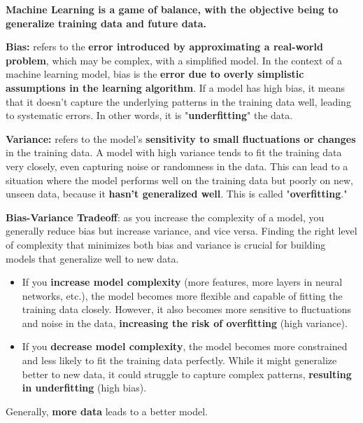 \textbf{Machine Learning is a game of balance, with the objective being to generalize training data and future data.}

\begin{definition}
\textbf{Bias:} refers to the \textbf{error introduced by approximating a real-world problem}, which may be complex, with a simplified model. In the context of a machine learning model, bias is the \textbf{error due to overly simplistic assumptions in the learning algorithm}. If a model has high bias, it means that it doesn't capture the underlying patterns in the training data well, leading to systematic errors. In other words, it is "\textbf{underfitting}" the data.
\end{definition}
    
\begin{definition}
\textbf{Variance:} refers to the model's \textbf{sensitivity to small fluctuations or changes} in the training data. A model with high variance tends to fit the training data very closely, even capturing noise or randomness in the data. This can lead to a situation where the model performs well on the training data but poorly on new, unseen data, because it \textbf{hasn't generalized well}. This is called "\textbf{overfitting}."
\end{definition}

\begin{theorem}
    \textbf{Bias-Variance Tradeoff}: as you increase the complexity of a model, you generally reduce bias but increase variance, and vice versa. Finding the right level of complexity that minimizes both bias and variance is crucial for building models that generalize well to new data.

    \begin{itemize}
        \item If you \textbf{increase model complexity} (more features, more layers in neural networks, etc.), the model becomes more flexible and capable of fitting the training data closely. However, it also becomes more sensitive to fluctuations and noise in the data, \textbf{increasing the risk of overfitting} (high variance).
        \item If you\textbf{ decrease model complexity}, the model becomes more constrained and less likely to fit the training data perfectly. While it might generalize better to new data, it could struggle to capture complex patterns, \textbf{resulting in underfitting} (high bias).
    \end{itemize}
\end{theorem}
\begin{idea}
    Generally, \textbf{more data} leads to a better model.
\end{idea}


